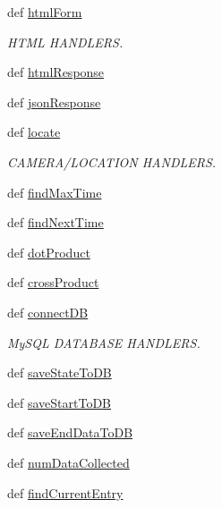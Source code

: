 \begin{DoxyCompactItemize}
\item 
def \hyperlink{namespacerobot_server_a3179f2c861172f46235068b70ec49aa4}{html\+Form}
\begin{DoxyCompactList}\small\item\em H\+T\+M\+L H\+A\+N\+D\+L\+E\+R\+S. \end{DoxyCompactList}\item 
def \hyperlink{namespacerobot_server_a6bb2ef04cec1313fe219ad0d4026d623}{html\+Response}
\item 
def \hyperlink{namespacerobot_server_a7cf853bf6d089f8aff7462dea0635505}{json\+Response}
\item 
def \hyperlink{namespacerobot_server_af96854f8704c2374b1faece3a09aba58}{locate}
\begin{DoxyCompactList}\small\item\em C\+A\+M\+E\+R\+A/\+L\+O\+C\+A\+T\+I\+O\+N H\+A\+N\+D\+L\+E\+R\+S. \end{DoxyCompactList}\item 
def \hyperlink{namespacerobot_server_af6f7c88782ee472dbabc087a7067c9a4}{find\+Max\+Time}
\item 
def \hyperlink{namespacerobot_server_ac61a36579b1ff41815996d03b5d01590}{find\+Next\+Time}
\item 
def \hyperlink{namespacerobot_server_acefe30e37a8b8c89f8d01a373fa2c9c3}{dot\+Product}
\item 
def \hyperlink{namespacerobot_server_aab85c3ddb2bfa79f6cfc691ec2d7002e}{cross\+Product}
\item 
def \hyperlink{namespacerobot_server_a16ed8e4a9f5a2f74b76f0113da04cb8d}{connect\+D\+B}
\begin{DoxyCompactList}\small\item\em My\+S\+Q\+L D\+A\+T\+A\+B\+A\+S\+E H\+A\+N\+D\+L\+E\+R\+S. \end{DoxyCompactList}\item 
def \hyperlink{namespacerobot_server_a9eaa696a7fb2b35e179de338b82d449b}{save\+State\+To\+D\+B}
\item 
def \hyperlink{namespacerobot_server_ad82aac81396feae3d320927a0e714dc5}{save\+Start\+To\+D\+B}
\item 
def \hyperlink{namespacerobot_server_ac05eca8e325b3b65fa8fdd679b117991}{save\+End\+Data\+To\+D\+B}
\item 
def \hyperlink{namespacerobot_server_a75eae201dbb88551a95cbc983d659353}{num\+Data\+Collected}
\item 
def \hyperlink{namespacerobot_server_acee1413bacea5205a3e924fe474d9ddb}{find\+Current\+Entry}

\end{DoxyCompactItemize}
